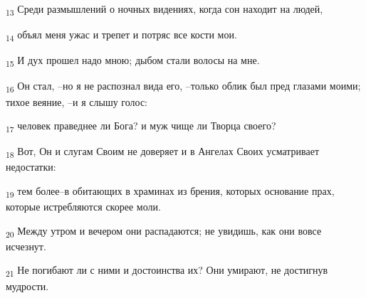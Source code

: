 \begin{tcolorbox}
\textsubscript{13} Среди размышлений о ночных видениях, когда сон находит на людей,
\end{tcolorbox}
\begin{tcolorbox}
\textsubscript{14} объял меня ужас и трепет и потряс все кости мои.
\end{tcolorbox}
\begin{tcolorbox}
\textsubscript{15} И дух прошел надо мною; дыбом стали волосы на мне.
\end{tcolorbox}
\begin{tcolorbox}
\textsubscript{16} Он стал, --но я не распознал вида его, --только облик был пред глазами моими; тихое веяние, --и я слышу голос:
\end{tcolorbox}
\begin{tcolorbox}
\textsubscript{17} человек праведнее ли Бога? и муж чище ли Творца своего?
\end{tcolorbox}
\begin{tcolorbox}
\textsubscript{18} Вот, Он и слугам Своим не доверяет и в Ангелах Своих усматривает недостатки:
\end{tcolorbox}
\begin{tcolorbox}
\textsubscript{19} тем более--в обитающих в храминах из брения, которых основание прах, которые истребляются скорее моли.
\end{tcolorbox}
\begin{tcolorbox}
\textsubscript{20} Между утром и вечером они распадаются; не увидишь, как они вовсе исчезнут.
\end{tcolorbox}
\begin{tcolorbox}
\textsubscript{21} Не погибают ли с ними и достоинства их? Они умирают, не достигнув мудрости.
\end{tcolorbox}
